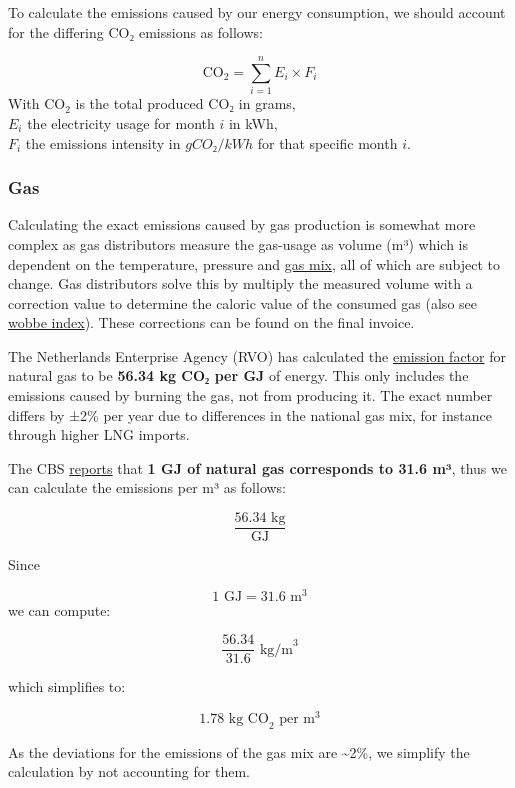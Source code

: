 \documentclass[
  letterpaper,
  DIV=11,
  numbers=noendperiod]{scrartcl}
\begin{document}
To calculate the emissions caused by our energy consumption, we should
account for the differing CO₂ emissions as follows:

\[
\text{CO}_2  = \sum_{i=1}^{n} E_i \times F_i 
\] With \(\text{CO}_2\) is the total produced CO₂ in grams,\\
\(E_i\) the electricity usage for month \(i\) in kWh,\\
\(F_i\) the emissions intensity in \(g CO₂/kWh\) for that specific month
\(i\).

\subsubsection{Gas}\label{gas}

Calculating the exact emissions caused by gas production is somewhat
more complex as gas distributors measure the gas-usage as volume (m³)
which is dependent on the temperature, pressure and
\href{https://eduweb.eeni.tbm.tudelft.nl/TB141E/?aardgas-conversie}{gas
mix}, all of which are subject to change. Gas distributors solve this by
multiply the measured volume with a correction value to determine the
caloric value of the consumed gas (also see
\href{https://eduweb.eeni.tbm.tudelft.nl/TB141E/?aardgas-conversie}{wobbe
index}). These corrections can be found on the final invoice.

The Netherlands Enterprise Agency (RVO) has calculated the
\href{https://www.rvo.nl/sites/default/files/2023-10/CO2-emissiefactor-aardgas-Nederlandse-rapportage-en-ETS-\%202023.pdf}{emission
factor} for natural gas to be \textbf{56.34 kg CO₂ per GJ} of energy.
This only includes the emissions caused by burning the gas, not from
producing it. The exact number differs by ±2\% per year due to
differences in the national gas mix, for instance through higher LNG
imports.

The CBS
\href{https://www.cbs.nl/nl-nl/onze-diensten/methoden/begrippen/joule}{reports}
that \textbf{1 GJ of natural gas corresponds to 31.6 m³}, thus we can
calculate the emissions per m³ as follows:

\[
\frac{56.34 \text{ kg}}{\text{GJ}}
\]

Since

\[
1 \text{ GJ} = 31.6 \text{ m}^3
\] we can compute:

\[
\frac{56.34}{31.6} \text{ kg/m}^3
\]

which simplifies to:

\[
1.78 \text{ kg CO}_2 \text{ per m}^3
\]

As the deviations for the emissions of the gas mix are
\textasciitilde2\%, we simplify the calculation by not accounting for
them.
\end{document}
